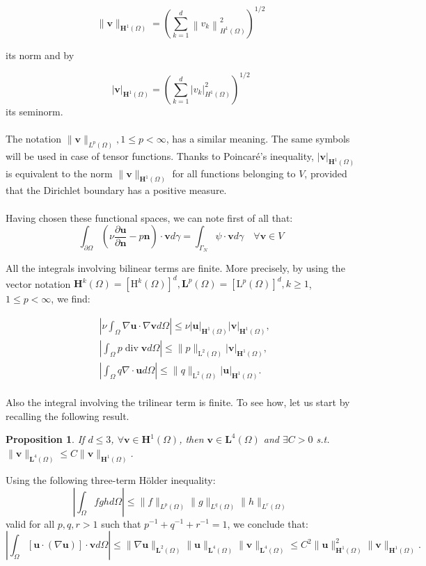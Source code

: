 \documentclass[11pt]{book}
\newtheorem{proposition}{Proposition}
\begin{document}
$$
\|\mathbf{v}\|_{\mathbf{H}^{1}(\Omega)}=\left(\sum_{k=1}^{d}\left\|v_{k}\right\|_{H^{1}(\Omega)}^{2}\right)^{1 / 2}
$$

its norm and by

$$
|\mathbf{v}|_{\mathbf{H}^{1}(\Omega)}=\left(\sum_{k=1}^{d}\left|v_{k}\right|_{H^{1}(\Omega)}^{2}\right)^{1 / 2}
$$
its seminorm. \\ \\
The notation $\|\mathbf{v}\|_{L^{p}(\Omega)}, 1 \leq p<\infty$, has a similar meaning. The same symbols will be used in case of tensor functions. Thanks to Poincaré's inequality, $|\mathbf{v}|_{\mathbf{H}^{1}(\Omega)}$ is equivalent to the norm $\|\mathbf{v}\|_{\mathbf{H}^{1}(\Omega)}$ for all functions belonging to $V$, provided that the Dirichlet boundary has a positive measure. \\ \\

Having chosen these functional spaces, we can note first of all that:
$$
\int_{\partial \Omega}\left(\nu \frac{\partial \mathbf{u}}{\partial \mathbf{n}}-p \mathbf{n}\right) \cdot \mathbf{v} d \gamma=\int_{\Gamma_{N}} \psi \cdot \mathbf{v} d \gamma \quad \forall \mathbf{v} \in V
$$


All the integrals involving bilinear terms are finite. More precisely, by using the vector notation $\mathbf{H}^{k}(\Omega)=\left[\mathrm{H}^{k}(\Omega)\right]^{d}, \mathbf{L}^{p}(\Omega)=\left[\mathrm{L}^{p}(\Omega)\right]^{d}, k \geq 1$, $1 \leq p<\infty$, we find:

$$
\begin{aligned}
& \left|\nu \int_{\Omega} \nabla \mathbf{u} \cdot \nabla \mathbf{v} d \Omega\right| \leq \nu|\mathbf{u}|_{\mathbf{H}^{1}(\Omega)}|\mathbf{v}|_{\mathbf{H}^{1}(\Omega)}, \\
& \left|\int_{\Omega} p \operatorname{div} \mathbf{v} d \Omega\right| \leq\|p\|_{\mathrm{L}^{2}(\Omega)}|\mathbf{v}|_{\mathbf{H}^{1}(\Omega)}, \\
& \left|\int_{\Omega} q \nabla \cdot \mathbf{u} d \Omega\right| \leq\|q\|_{\mathrm{L}^{2}(\Omega)}|\mathbf{u}|_{\mathbf{H}^{1}(\Omega)} .
\end{aligned}
$$
\\
Also the integral involving the trilinear term is finite. To see how, let us start by recalling the following result. 
\begin{proposition}
    If $d \leq 3$, $\forall \mathbf{v} \in \mathbf{H}^{1}(\Omega)$, then $\mathbf{v} \in \mathbf{L}^{4}(\Omega)$ and $\exists C>0$ s.t. $\|\mathbf{v}\|_{\mathbf{L}^{4}(\Omega)} \leq C\|\mathbf{v}\|_{\mathbf{H}^{1}(\Omega)}$.
    \end{proposition}
Using the following three-term Hölder inequality:
$$
\left|\int_{\Omega} f g h d \Omega\right| \leq\|f\|_{L^{p}(\Omega)}\|g\|_{L^{q}(\Omega)}\|h\|_{L^{r}(\Omega)}
$$
valid for all $p, q, r>1$ such that $p^{-1}+q^{-1}+r^{-1}=1$, we conclude that:$$\left|\int_{\Omega}[\mathbf{u} \cdot (\nabla \mathbf{u})] \cdot \mathbf{v} d \Omega\right| \leq\|\nabla \mathbf{u}\|_{\mathbf{L}^{2}(\Omega)}\|\mathbf{u}\|_{\mathbf{L}^{4}(\Omega)}\|\mathbf{v}\|_{\mathbf{L}^{4}(\Omega)} \leq C^{2}\|\mathbf{u}\|_{\mathbf{H}^{1}(\Omega)}^{2}\|\mathbf{v}\|_{\mathbf{H}^{1}(\Omega)}.$$
\end{document}
